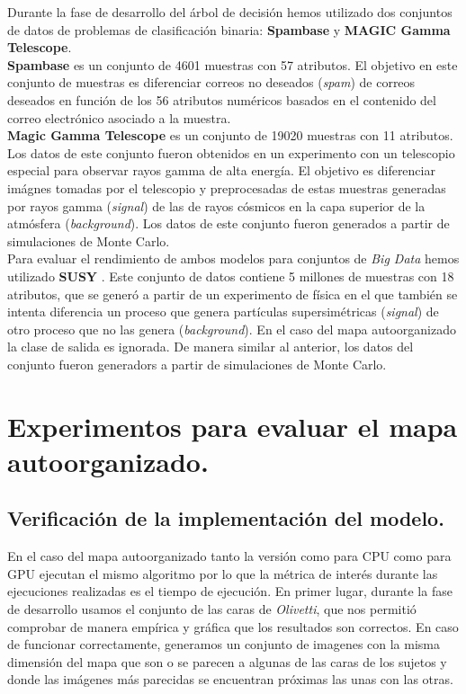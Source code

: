 Durante la fase de desarrollo del árbol de decisión hemos utilizado dos conjuntos de datos de problemas de clasificación binaria: \textbf{Spambase} y \textbf{MAGIC Gamma Telescope}.\\

\textbf{Spambase} \cite{spambase} es un conjunto de 4601 muestras con 57 atributos. El objetivo en este conjunto de muestras es diferenciar correos no deseados (\textit{spam}) de correos deseados en función de los 56 atributos numéricos basados en el contenido del correo electrónico asociado a la muestra.\\

\textbf{Magic Gamma Telescope} \cite{magic04} es un conjunto de 19020 muestras con 11 atributos. Los datos de este conjunto fueron obtenidos en un experimento con un telescopio especial para observar rayos gamma de alta energía. El objetivo es diferenciar imágnes tomadas por el telescopio y preprocesadas de estas muestras generadas por rayos gamma (\textit{signal}) de las de rayos cósmicos en la capa superior de la atmósfera (\textit{background}). Los datos de este conjunto fueron generados a partir de simulaciones de Monte Carlo.\\

Para evaluar el rendimiento de ambos modelos para conjuntos de \textit{Big Data} hemos utilizado \textbf{SUSY} \cite{susy}. Este conjunto de datos contiene 5 millones de muestras con 18 atributos, que se generó a partir de un experimento de física en el que también se intenta diferencia un proceso que genera partículas supersimétricas (\textit{signal}) de otro proceso que no las genera (\textit{background}). En el caso del mapa autoorganizado la clase de salida es ignorada. De manera similar al anterior, los datos del conjunto fueron generadors a partir de simulaciones de Monte Carlo.


\section{Experimentos para evaluar el mapa autoorganizado.}
\subsection{Verificación de la implementación del modelo.}
En el caso del mapa autoorganizado tanto la versión como para CPU como para GPU ejecutan el mismo algoritmo por lo que la métrica de interés durante las ejecuciones realizadas es el tiempo de ejecución. En primer lugar, durante la fase de desarrollo usamos el conjunto de las caras de \textit{Olivetti}, que nos permitió comprobar de manera empírica y gráfica que los resultados son correctos. En caso de funcionar correctamente, generamos un conjunto de imagenes con la misma dimensión del mapa que son o se parecen a algunas de las caras de los sujetos y donde las imágenes más parecidas se encuentran próximas las unas con las otras. \\

